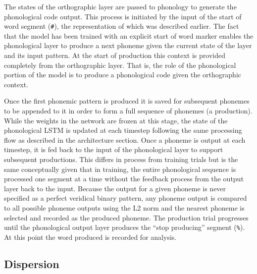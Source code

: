 \documentclass[
  american,
  man,floatsintext]{apa6}
\begin{document}
The states of the orthographic layer are passed to phonology to generate the phonological code output. This process is initiated by the input of the start of word segment (\texttt{\#}), the representation of which was described earlier. The fact that the model has been trained with an explicit start of word marker enables the phonological layer to produce a next phoneme given the current state of the layer and its input pattern. At the start of production this context is provided completely from the orthographic layer. That is, the role of the phonological portion of the model is to produce a phonological code given the orthographic context.

Once the first phonemic pattern is produced it is saved for subsequent phonemes to be appended to it in order to form a full sequence of phonemes (a production). While the weights in the network are frozen at this stage, the state of the phonological LSTM is updated at each timestep following the same processing flow as described in the architecture section. Once a phoneme is output at each timestep, it is fed back to the input of the phonological layer to support subsequent productions. This differs in process from training trials but is the same conceptually given that in training, the entire phonological sequence is processed one segment at a time without the feedback process from the output layer back to the input. Because the output for a given phoneme is never specified as a perfect veridical binary pattern, any phoneme output is compared to all possible phoneme outputs using the L2 norm and the nearest phoneme is selected and recorded as the produced phoneme. The production trial progresses until the phonological output layer produces the ``stop producing'' segment (\texttt{\%}). At this point the word produced is recorded for analysis.

\hypertarget{dispersion}{%
\subsection{Dispersion}\label{dispersion}}
\end{document}
